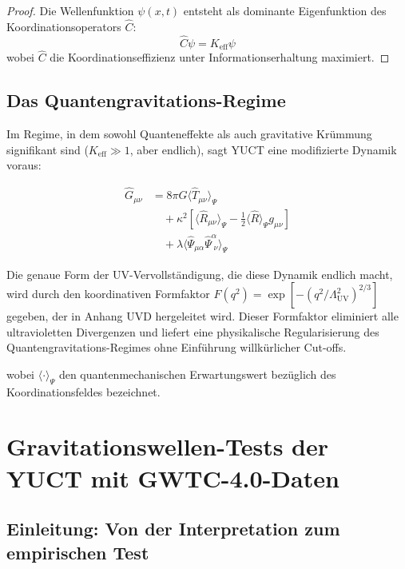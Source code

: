 \documentclass[12pt,a4paper]{article}
\theoremstyle{remark}
\newcommand{\Keff}{K_{\mathrm{eff}}}
\begin{document}
	\begin{proof}
		Die Wellenfunktion $\psi(x,t)$ entsteht als dominante Eigenfunktion des Koordinationsoperators $\hat{C}$:
		\[
		\hat{C} \psi = \Keff \psi
		\]
		wobei $\hat{C}$ die Koordinationseffizienz unter Informationserhaltung maximiert.
	\end{proof}
	
	\subsection{Das Quantengravitations-Regime}
	
	Im Regime, in dem sowohl Quanteneffekte als auch gravitative Krümmung signifikant sind ($\Keff \gg 1$, aber endlich), sagt YUCT eine modifizierte Dynamik voraus:
	
	\begin{equation}
		\begin{aligned}
			\hat{G}_{\mu\nu} &= 8\pi G \langle \hat{T}_{\mu\nu} \rangle_{\Psi} \\
			&\quad + \kappa^2 \left[ \langle \hat{R}_{\mu\nu} \rangle_{\Psi} - \frac{1}{2} \langle \hat{R} \rangle_{\Psi} g_{\mu\nu} \right] \\
			&\quad + \lambda \langle \hat{\Psi}_{\mu\alpha} \hat{\Psi}^{\alpha}_{\;\nu} \rangle_{\Psi}
		\end{aligned}
	\end{equation}
	
	Die genaue Form der UV-Vervollständigung, die diese Dynamik endlich macht,
	wird durch den koordinativen Formfaktor $F(q^2)=\exp[-(q^2/\Lambda_{\mathrm{UV}}^2)^{2/3}]$
	gegeben, der in Anhang UVD hergeleitet wird. Dieser Formfaktor eliminiert alle
	ultravioletten Divergenzen und liefert eine physikalische Regularisierung des
	Quantengravitations-Regimes ohne Einführung willkürlicher Cut-offs.
	
	wobei $\langle \cdot \rangle_{\Psi}$ den quantenmechanischen Erwartungswert bezüglich des Koordinationsfeldes bezeichnet.
	
	\section{Gravitationswellen-Tests der YUCT mit GWTC-4.0-Daten}
	\label{sec:gw-tests}
	
	\subsection{Einleitung: Von der Interpretation zum empirischen Test}
	
\end{document}
